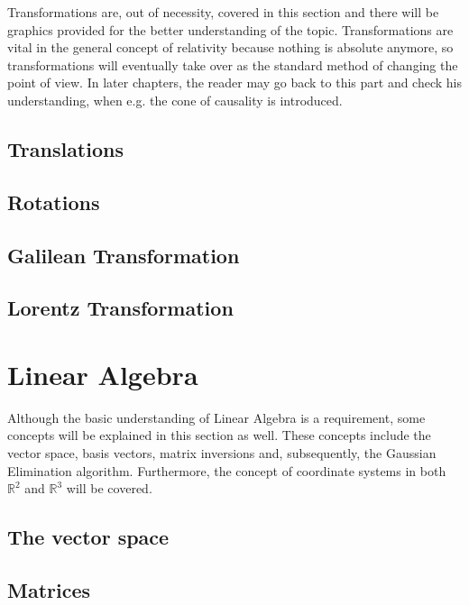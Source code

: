 Transformations are, out of necessity, covered in this section and there 
will be graphics provided for the better understanding of the topic.
Transformations are vital in the general concept of relativity because 
nothing is absolute anymore, so transformations will eventually take over 
as the standard method of changing the point of view. In later chapters,
the reader may go back to this part and check his understanding, 
when e.g. the cone of causality is introduced.

\subsection{Translations}
\label{subsec:translations}

\subsection{Rotations}
\label{subsec:rotations}

\subsection{Galilean Transformation}
\label{subsec:galilean}




\subsection{Lorentz Transformation}
\label{subsec:lorentz}

\section{Linear Algebra}
\label{sec:linear-algebra}

Although the basic understanding of Linear Algebra is a requirement, some
concepts will be explained in this section as well. These concepts include 
the vector space, basis vectors, matrix inversions and, subsequently, the
Gaussian Elimination algorithm. Furthermore, the concept of coordinate 
systems in both $\mathbb{R}^2$ and $\mathbb{R}^3$ will be covered.

\subsection{The vector space}
\label{subsec:vector-space}

\subsection{Matrices}
\label{subsec:matrices}

